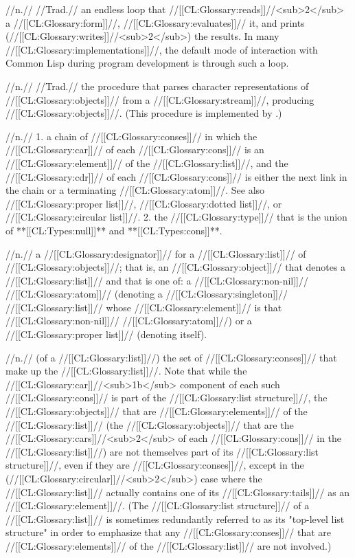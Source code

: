  //n.// //Trad.// an endless loop that //[[CL:Glossary:reads]]//<sub>2</sub> a //[[CL:Glossary:form]]//, //[[CL:Glossary:evaluates]]// it, and prints (\ie //[[CL:Glossary:writes]]//<sub>2</sub>) the results. In many //[[CL:Glossary:implementations]]//, the default mode of interaction with Common Lisp during program development is through such a loop.

 //n.// //Trad.// the procedure that parses character representations of //[[CL:Glossary:objects]]// from a //[[CL:Glossary:stream]]//, producing //[[CL:Glossary:objects]]//. (This procedure is implemented by .) %
 
 //n.// 1. a chain of //[[CL:Glossary:conses]]// in which the //[[CL:Glossary:car]]// of each //[[CL:Glossary:cons]]// is an //[[CL:Glossary:element]]// of the //[[CL:Glossary:list]]//, and the //[[CL:Glossary:cdr]]// of each //[[CL:Glossary:cons]]// is either the next link in the chain or a terminating //[[CL:Glossary:atom]]//. See also //[[CL:Glossary:proper list]]//, //[[CL:Glossary:dotted list]]//, or //[[CL:Glossary:circular list]]//. 2. the //[[CL:Glossary:type]]// that is the union of **[[CL:Types:null]]** and **[[CL:Types:cons]]**.

 //n.// a //[[CL:Glossary:designator]]// for a //[[CL:Glossary:list]]// of //[[CL:Glossary:objects]]//; that is, an //[[CL:Glossary:object]]// that denotes a //[[CL:Glossary:list]]// and that is one of: a //[[CL:Glossary:non-nil]]// //[[CL:Glossary:atom]]// (denoting a //[[CL:Glossary:singleton]]// //[[CL:Glossary:list]]// whose //[[CL:Glossary:element]]// is that //[[CL:Glossary:non-nil]]// //[[CL:Glossary:atom]]//) or a //[[CL:Glossary:proper list]]// (denoting itself).

 //n.// (of a //[[CL:Glossary:list]]//) the set of //[[CL:Glossary:conses]]// that make up the //[[CL:Glossary:list]]//. Note that while the //[[CL:Glossary:car]]//<sub>1b</sub> component of each such //[[CL:Glossary:cons]]// is part of the //[[CL:Glossary:list structure]]//, the //[[CL:Glossary:objects]]// that are //[[CL:Glossary:elements]]// of the //[[CL:Glossary:list]]// (\ie the //[[CL:Glossary:objects]]// that are the //[[CL:Glossary:cars]]//<sub>2</sub> of each //[[CL:Glossary:cons]]// in the //[[CL:Glossary:list]]//) are not themselves part of its //[[CL:Glossary:list structure]]//, even if they are //[[CL:Glossary:conses]]//, except in the (//[[CL:Glossary:circular]]//<sub>2</sub>) case where the //[[CL:Glossary:list]]// actually contains one of its //[[CL:Glossary:tails]]// as an //[[CL:Glossary:element]]//. (The //[[CL:Glossary:list structure]]// of a //[[CL:Glossary:list]]// is sometimes redundantly referred to as its "top-level list structure" in order to emphasize that any //[[CL:Glossary:conses]]// that are //[[CL:Glossary:elements]]// of the //[[CL:Glossary:list]]// are not involved.)


